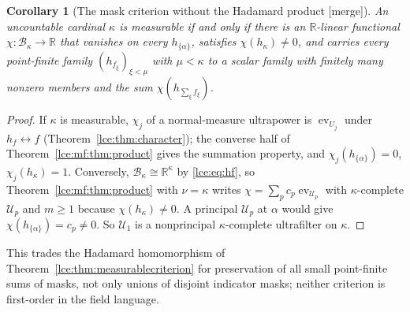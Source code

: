 \documentclass[11pt,letterpaper]{article}
\numberwithin{equation}{section}
\newtheorem{corollary}[theorem]{Corollary}
\theoremstyle{definition}
\theoremstyle{remark}
\newcommand{\R}{\mathbb R}
\newcommand{\thref}[1]{Theorem~\ref{#1}}
\newcommand{\mergetag}{\textup{\textsf{\small[merge]}}}%
\newcommand{\ev}{\operatorname{ev}}
\begin{document}
\begin{corollary}[The mask criterion without the Hadamard product \mergetag]
\label{lce:mf:cor:maskcriterion}
An uncountable cardinal $\kappa$ is measurable if and only if there is an
$\R$-linear functional $\chi:\mathcal B_\kappa\to\R$ that vanishes on every
$h_{\{\alpha\}}$, satisfies $\chi(h_\kappa)\ne0$, and carries every
point-finite family $(h_{f_\xi})_{\xi<\mu}$ with $\mu<\kappa$ to a scalar
family with finitely many nonzero members and the sum
$\chi(h_{\sum_\xi f_\xi})$.
\end{corollary}
\begin{proof}
If $\kappa$ is measurable, $\chi_j$ of a normal-measure ultrapower is
$\ev_{U_j}$ under $h_f\leftrightarrow f$ (\thref{lce:thm:character}); the
converse half of \thref{lce:mf:thm:product} gives the summation property,
and $\chi_j(h_{\{\alpha\}})=0$, $\chi_j(h_\kappa)=1$. Conversely,
$\mathcal B_\kappa\cong\R^\kappa$ by \eqref{lce:eq:hf}, so
\thref{lce:mf:thm:product} with $\nu=\kappa$ writes
$\chi=\sum_pc_p\ev_{\mathcal U_p}$ with $\kappa$-complete $\mathcal U_p$ and
$m\ge1$ because $\chi(h_\kappa)\ne0$. A principal $\mathcal U_p$ at $\alpha$
would give $\chi(h_{\{\alpha\}})=c_p\ne0$. So $\mathcal U_1$ is a nonprincipal
$\kappa$-complete ultrafilter on $\kappa$.
\end{proof}
This trades the Hadamard homomorphism of \thref{lce:thm:measurablecriterion}
for preservation of all small point-finite sums of masks, not only unions of
disjoint indicator masks; neither criterion is first-order in the field
language.
\end{document}
